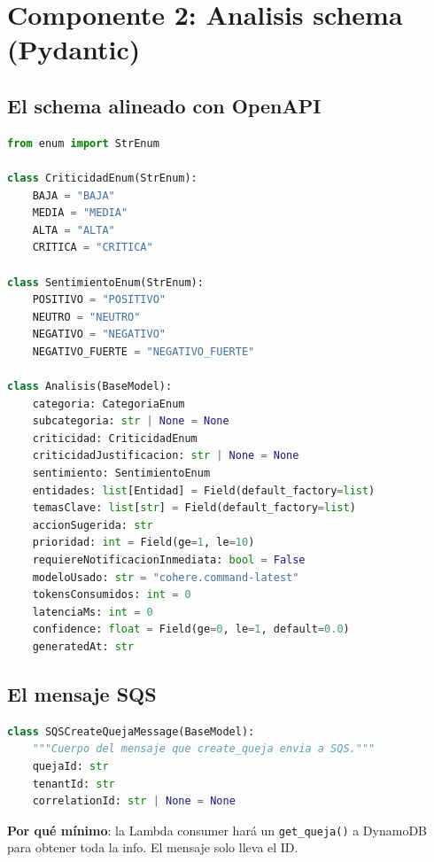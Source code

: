 \documentclass[11pt,a4paper,oneside]{article}
\begin{document}
\section{Componente 2: Analisis schema (Pydantic)}

\subsection{El schema alineado con OpenAPI}

\begin{lstlisting}[language=Python,caption={handlers/\_shared/schemas.py --- Analisis}]
from enum import StrEnum

class CriticidadEnum(StrEnum):
    BAJA = "BAJA"
    MEDIA = "MEDIA"
    ALTA = "ALTA"
    CRITICA = "CRITICA"

class SentimientoEnum(StrEnum):
    POSITIVO = "POSITIVO"
    NEUTRO = "NEUTRO"
    NEGATIVO = "NEGATIVO"
    NEGATIVO_FUERTE = "NEGATIVO_FUERTE"

class Analisis(BaseModel):
    categoria: CategoriaEnum
    subcategoria: str | None = None
    criticidad: CriticidadEnum
    criticidadJustificacion: str | None = None
    sentimiento: SentimientoEnum
    entidades: list[Entidad] = Field(default_factory=list)
    temasClave: list[str] = Field(default_factory=list)
    accionSugerida: str
    prioridad: int = Field(ge=1, le=10)
    requiereNotificacionInmediata: bool = False
    modeloUsado: str = "cohere.command-latest"
    tokensConsumidos: int = 0
    latenciaMs: int = 0
    confidence: float = Field(ge=0, le=1, default=0.0)
    generatedAt: str
\end{lstlisting}

\subsection{El mensaje SQS}

\begin{lstlisting}[language=Python,caption={handlers/\_shared/schemas.py --- SQS message}]
class SQSCreateQuejaMessage(BaseModel):
    """Cuerpo del mensaje que create_queja envia a SQS."""
    quejaId: str
    tenantId: str
    correlationId: str | None = None
\end{lstlisting}

\textbf{Por qu\'e m\'inimo}: la Lambda consumer har\'a un \texttt{get\_queja()} a DynamoDB para obtener toda la info. El mensaje solo lleva el ID.
\end{document}
